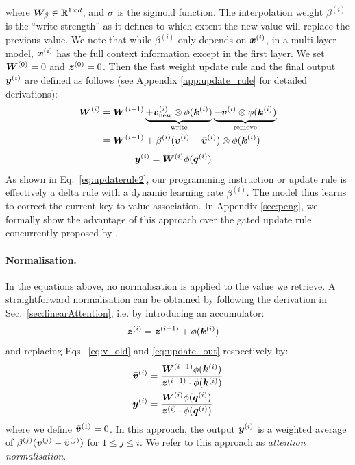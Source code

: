 \documentclass{article}
\theoremstyle{definition}
\begin{document}
where ${\bm{W}}_\beta \in \mathbb{R}^{1 \times d}$, and $\sigma$ is the sigmoid function. 
The interpolation weight $\beta^{(i)}$  is the ``write-strength'' as it defines to which extent the new value will replace the previous value.
We note that while $\beta^{(i)}$ only depends on ${\bm{x}}^{(i)}$,
in a multi-layer model, ${\bm{x}}^{(i)}$ has the full context information except in
the first layer.
We set ${\bm{W}}^{(0)}=0$ and ${\bm{z}}^{(0)}=0$.
Then the fast weight update rule and the final output ${\bm{y}}^{(i)}$ are defined as follows (see Appendix \ref{app:update_rule} for detailed derivations):
\begin{align}
\label{eq:updaterule}
{\bm{W}}^{(i)} &= {\bm{W}}^{(i-1)}
    \underbrace{+ {\bm{v}}^{(i)}_\text{new} \otimes \phi({\bm{k}}^{(i)})}_{\text{write}}
    \underbrace{- \bar{{\bm{v}}}^{(i)} \otimes \phi({\bm{k}}^{(i)})}_{\text{remove}} \\
&= {\bm{W}}^{(i-1)} + \beta^{(i)}({\bm{v}}^{(i)} - \bar{{\bm{v}}}^{(i)}) \otimes \phi({\bm{k}}^{(i)})  \label{eq:updaterule2}
\end{align}
\begin{align}
{\bm{y}}^{(i)}  &= {\bm{W}}^{(i)} \phi({\bm{q}}^{(i)}) \label{eq:update_out}
\end{align}
As shown in Eq.~\ref{eq:updaterule2}, our programming
instruction or update rule is effectively a delta rule
with a dynamic learning rate $\beta^{(i)}$.
The model thus learns to correct the current
key to value association.
In Appendix \ref{sec:peng}, we formally show
the advantage of this approach over the 
gated update rule concurrently proposed by \citet{peng2021random}.

\paragraph{Normalisation.}
In the equations above, no normalisation is applied to the value we retrieve.
A straightforward normalisation can be obtained by following the derivation in Sec.~\ref{sec:linearAttention}, i.e. by introducing an accumulator:
\begin{align}
{\bm{z}}^{(i)} &= {\bm{z}}^{(i-1)} + \phi({\bm{k}}^{(i)}) \label{eq:acc}
\end{align}
and replacing Eqs.~\ref{eq:v_old} and \ref{eq:update_out} respectively by:
\begin{align}
\bar{{\bm{v}}}^{(i)} &= \frac{{\bm{W}}^{(i-1)} \phi({\bm{k}}^{(i)})}{{\bm{z}}^{(i-1)} \cdot \phi({\bm{k}}^{(i)})} \\
{\bm{y}}^{(i)}  &= \displaystyle \dfrac{{\bm{W}}^{(i)} \phi({\bm{q}}^{(i)})}{{\bm{z}}^{(i)} \cdot \phi({\bm{q}}^{(i)})} 
\end{align}
where we define $\bar{{\bm{v}}}^{(1)}=0$.
In this approach, the output ${\bm{y}}^{(i)}$ is a weighted average of $\beta^{(j)}({\bm{v}}^{(j)} - \bar{{\bm{v}}}^{(j)})$ for $1\leq j \leq i$.
We refer to this approach as \textit{attention normalisation}.
\end{document}
